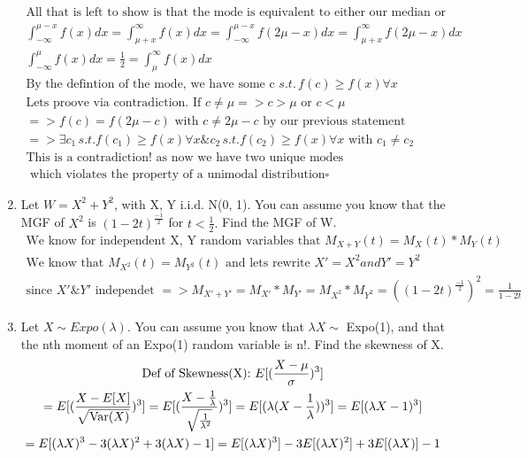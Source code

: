 \documentclass[11pt]{article}
\newcommand{\Var}{\mathop{\rm Var}}
\begin{document}
\begin{enumerate}
\begin{gather}
	\text{All that is left to show is that the mode is equivalent to either our median or mean}\\
	\int_{-\infty}^{\mu - x} f(x)dx = \int_{\mu + x}^{\infty} f(x)dx = \int_{-\infty}^{\mu - x} f(2\mu - x)dx = \int_{\mu + x}^{\infty} f(2\mu - x)dx\\
	\int_{-\infty}^{\mu} f(x)dx = \frac{1}{2}= \int_{\mu}^{\infty} f(x)dx\\
	\text{By the defintion of the mode, we have some c } s.t. \, f(c) \ge f(x) \forall x\\
	\text{Lets proove via contradiction. If } c \ne \mu => c > \mu \text{ or } c<\mu\\
	=> f(c) = f(2\mu - c) \text{ with } c \ne 2\mu-c \text{ by our previous statement}\\
	=> \exists c_1 \, s.t. f(c_1)\ge f(x) \forall x \& c_2 \, s.t. f(c_2)\ge f(x) \forall x \text{ with } c_1 \ne c_2\\
	\text{This is a contradiction! as now we have two unique modes}\\
	\text{ which violates the property of a unimodal distribution} \square
\end{gather}
\item Let $W = X^2 + Y^2$, with X, Y i.i.d. N(0, 1). You can assume you know that the MGF of $X^2$ is $(1 - 2t)^{\frac{-1}{2}}$ for $t < \frac{1}{2}.$ 
Find the MGF of W.
\begin{gather}
	\text{We know for independent X, Y random variables that } M_{X+Y}(t)=M_X(t)*M_Y(t) \\
	\text{We know that }M_{X^2}(t)=M_{Y^2}(t) \text{ and lets rewrite }X'=X^2 and Y' = Y^2\\
	\text{since } X' \& Y' \text{ independet } => M_{X'+Y'}=M_{X'}*M_{Y'}=M_{X^2}*M_{Y^2}=((1 - 2t)^{\frac{-1}{2}})^2 =\frac{1}{1-2t}
\end{gather}
\item Let $X \sim Expo(\lambda)$. You can assume you know that $\lambda X \sim$ Expo(1), and that the nth moment of an Expo(1) random variable is n!. Find the skewness of X.
\begin{gather}
	\text{Def of Skewness(X): } E[(\frac{X-\mu}{\sigma})^3]\\
	= E[(\frac{X-E[X]}{\sqrt{\Var(X)}})^3]=E[(\frac{X-\frac{1}{\lambda}}{\sqrt{\frac{1}{\lambda^2}}})^3] = E[(\lambda(X-\frac{1}{\lambda}))^3]= E[(\lambda X-1)^3] \\
	= E[(\lambda X)^3-3(\lambda X)^2 + 3(\lambda X) - 1] = E[(\lambda X)^3] - 3E[(\lambda X)^2] + 3E[(\lambda X)] - 1\\

\end{gather}
\end{enumerate}
\end{document}
